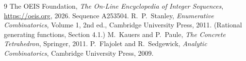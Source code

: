 \documentclass[11pt,a4paper]{article}
\theoremstyle{plain}
\theoremstyle{definition}
\begin{document}
\begin{thebibliography}{9}
 The OEIS Foundation, \emph{The On-Line Encyclopedia of Integer
Sequences}, \url{https://oeis.org}, 2026. Sequence A253504.
 R.~P.~Stanley, \emph{Enumerative Combinatorics}, Volume 1, 2nd ed.,
Cambridge University Press, 2011. (Rational generating functions, Section 4.1.)
 M.~Kauers and P.~Paule, \emph{The Concrete Tetrahedron}, Springer, 2011.
 P.~Flajolet and R.~Sedgewick, \emph{Analytic Combinatorics}, Cambridge
University Press, 2009.
\end{thebibliography}
\end{document}
